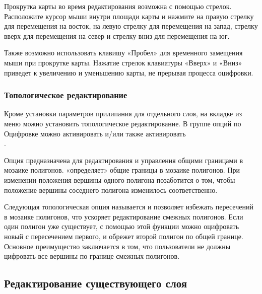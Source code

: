 Прокрутка карты во время редактирования возможна с помощью стрелок. Расположите
курсор мыши внутри площади карты и нажмите на правую стрелку для перемещения на
восток, на левую стрелку для перемещения на запад, стрелку вверх для перемещения на
север и стрелку вниз для перемещения на юг.

Также возможно использовать клавишу «Пробел» для временного замещения мыши при
прокрутке карты. Нажатие стрелок клавиатуры «Вверх» и «Вниз» приведет к
увеличению и уменьшению карты, не прерывая процесса оцифровки.

\subsubsection{Топологическое редактирование}

Кроме установки параметров прилипания для отдельного слоя, на вкладке 
из меню
 \arrow {}
можно установить топологическое редактирование. В группе опций по Оцифровке
можно активировать  и/или
также активировать \\
.


Опция  предназначена для
редактирования и управления общими границами в мозаике полигонов. \qg
«определяет» общие границы в мозаике полигонов. При изменении положения
вершины одного полигона \qg позаботится о том, чтобы положение вершины
соседнего полигона изменилось соответственно.


Следующая топологическая опция называется  и позволяет избежать пересечений в мозаике полигонов, что
ускоряет редактирование смежных полигонов. Если один полигон уже существует,
с помощью этой функции можно оцифровать новый с пересечением первого, и
\qg обрежет второй полигон по общей границе. Основное преимущество заключается
в том, что пользователи не должны цифровать все вершины по границе смежных
полигонов.

\subsection{Редактирование существующего слоя}
\label{sec:edit_existing_layer}

